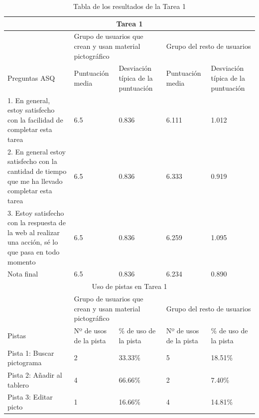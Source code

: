 \begin{table}

\begin{tabular}{ |p{4cm}|p{2cm}|p{2cm}|p{2cm}|p{2cm}|  }
	\hline
	\multicolumn{5}{|c|}{Tarea 1} \\
	\hline
	 & \multicolumn{2}{|p{4cm}|}{Grupo de usuarios que crean y usan material pictográfico} & \multicolumn{2}{|p{4cm}|}{Grupo del resto de usuarios }  \\ 
	\hline
	 Preguntas ASQ & Puntuación media  &Desviación típica de la puntuación & Puntuación media & Desviación típica de la puntuación\\
	\hline
	1. En general, estoy satisfecho con la facilidad de completar esta tarea &6.5  &0.836 &6.111  &1.012\\
	\hline
	2. En general estoy satisfecho con la cantidad de tiempo que me ha llevado completar esta tarea&6.5  &0.836  &6.333 &0.919\\
	\hline
	3. Estoy satisfecho con la respuesta de la web al realizar una acción, sé lo que pasa en todo momento &6.5 &0.836 & 6.259  &1.095\\
	\hline
	Nota final &6.5 &0.836 &6.234  &0.890\\
	\hline
	\multicolumn{5}{|c|}{Uso de pistas en Tarea 1} \\
	\hline
	& \multicolumn{2}{|p{4cm}|}{Grupo de usuarios que crean y usan material pictográfico} & \multicolumn{2}{|p{4cm}|}{Grupo del resto de usuarios }  \\ 
	\hline
	 Pistas &Nº de usos de la pista &\% de uso de la pista&Nº de usos de la pista&\% de uso de la pista\\
	\hline
	Pista 1: Buscar pictograma &2  &33.33\% &5  &18.51\%\\
	\hline
	Pista 2: Añadir al tablero &4  &66.66\%  &2 &7.40\%\\
	\hline
	Pista 3: Editar picto &1 &16.66\% &4  &14.81\%\\
	\hline
\end{tabular}
\caption{\label{tab:area1respuestas}Tabla de los resultados de la Tarea 1}
\end{table}

